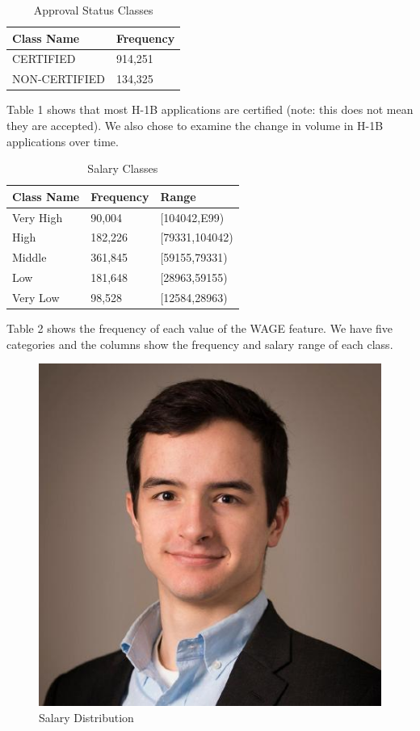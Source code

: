 \documentclass[sigconf]{acmart}
\begin{document}
\begin{table}[h]
	\caption{Approval Status Classes}
    \begin{tabular}{l l}
        Class Name &Frequency \\
        \hline
        CERTIFIED&914,251 \\
        NON-CERTIFIED&134,325
    \end{tabular}
\end{table}

Table 1 shows that most H-1B applications are certified (note: this does not mean they are
accepted). We also chose to examine the change in volume in H-1B applications over time.

\begin{table}[h]
	\caption{Salary Classes}
    \begin{tabular}{l l l}
        Class Name&Frequency&Range \\
        \hline
        Very High& 90,004   & [104042,E99)\\
        High     & 182,226  & [79331,104042)\\
        Middle   & 361,845  & [59155,79331)\\
        Low      & 181,648  & [28963,59155)\\
        Very Low & 98,528   & [12584,28963)\\
    \end{tabular}
\end{table}

Table 2 shows the frequency of each value of the WAGE feature. We have five categories and the
columns show the frequency and salary range of each class.

\begin{figure}[h]
  \centering
  \includegraphics[scale=.4]{figure1.png}
  \caption{Salary Distribution}\label{fig:digit}
\end{figure}
\end{document}
